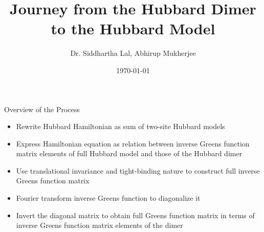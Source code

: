 \documentclass[aspectratio=169]{beamer}
\title{
\vspace*{\fill}
\LARGE{Journey from the Hubbard Dimer\\
to the Hubbard Model}
\vspace*{\fill}
}
\author{Dr. Siddhartha Lal, Abhirup Mukherjee}
\institute{Department of Physical Sciences\\IISER Kolkata}
\date{\today}
\begin{document}
\begin{frame}{}
\maketitle
\end{frame}

\begin{frame}{Overview of the Process}
\begin{itemize}[<alert@+>]
	\item Rewrite Hubbard Hamiltonian as sum of two-site Hubbard models
	\item Express Hamiltonian equation as relation between inverse Greens function matrix elements of full Hubbard model and those of the Hubbard dimer
	\item Use translational invariance and tight-binding nature to construct full inverse Greens function matrix 
	\item Fourier transform inverse Greens function to diagonalize it
	\item Invert the diagonal matrix to obtain full Greens function matrix in terms of inverse Greens function matrix elements of the dimer
\end{itemize}
\end{frame}
\end{document}
